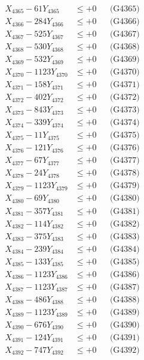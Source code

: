 \documentclass[a4paper,10pt]{article}
\begin{document}
{\begin{align}
X_{4365} - 61Y_{4365} &\leq +0 && \text{(G4365)} \\
X_{4366} - 284Y_{4366} &\leq +0 && \text{(G4366)} \\
X_{4367} - 525Y_{4367} &\leq +0 && \text{(G4367)} \\
X_{4368} - 530Y_{4368} &\leq +0 && \text{(G4368)} \\
X_{4369} - 532Y_{4369} &\leq +0 && \text{(G4369)} \\
X_{4370} - 1123Y_{4370} &\leq +0 && \text{(G4370)} \\
\allowbreak
X_{4371} - 158Y_{4371} &\leq +0 && \text{(G4371)} \\
X_{4372} - 402Y_{4372} &\leq +0 && \text{(G4372)} \\
X_{4373} - 843Y_{4373} &\leq +0 && \text{(G4373)} \\
X_{4374} - 339Y_{4374} &\leq +0 && \text{(G4374)} \\
X_{4375} - 11Y_{4375} &\leq +0 && \text{(G4375)} \\
X_{4376} - 121Y_{4376} &\leq +0 && \text{(G4376)} \\
X_{4377} - 67Y_{4377} &\leq +0 && \text{(G4377)} \\
X_{4378} - 24Y_{4378} &\leq +0 && \text{(G4378)} \\
X_{4379} - 1123Y_{4379} &\leq +0 && \text{(G4379)} \\
X_{4380} - 69Y_{4380} &\leq +0 && \text{(G4380)} \\
\allowbreak
X_{4381} - 357Y_{4381} &\leq +0 && \text{(G4381)} \\
X_{4382} - 114Y_{4382} &\leq +0 && \text{(G4382)} \\
X_{4383} - 375Y_{4383} &\leq +0 && \text{(G4383)} \\
X_{4384} - 239Y_{4384} &\leq +0 && \text{(G4384)} \\
X_{4385} - 133Y_{4385} &\leq +0 && \text{(G4385)} \\
X_{4386} - 1123Y_{4386} &\leq +0 && \text{(G4386)} \\
X_{4387} - 1123Y_{4387} &\leq +0 && \text{(G4387)} \\
X_{4388} - 486Y_{4388} &\leq +0 && \text{(G4388)} \\
X_{4389} - 1123Y_{4389} &\leq +0 && \text{(G4389)} \\
X_{4390} - 676Y_{4390} &\leq +0 && \text{(G4390)} \\
\allowbreak
X_{4391} - 124Y_{4391} &\leq +0 && \text{(G4391)} \\
X_{4392} - 747Y_{4392} &\leq +0 && \text{(G4392)} \\

\end{align}}
\end{document}
